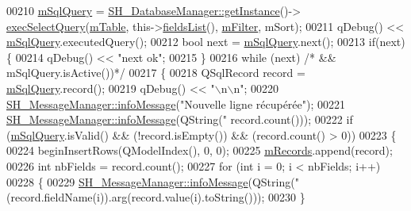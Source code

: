 \begin{DoxyCode}
00210             \hyperlink{classSH__SqlDataModel_a54f0cf057e3200f6b199508958e43fec}{mSqlQuery} = \hyperlink{classSH__DatabaseManager_a31198eb4de0f8b18e3fa0eed09f24d19}{SH\_DatabaseManager::getInstance}()->
      \hyperlink{classSH__DatabaseManager_ab8f9850cb68444ab9a4e613b36a3b044}{execSelectQuery}(\hyperlink{classSH__SqlDataModel_a88b8738a0d2803c94295c90c83d65f32}{mTable}, this->\hyperlink{classSH__SqlDataModel_a571bdc1f9592bd13f98fd748563d46c0}{fieldsList}(), 
      \hyperlink{classSH__SqlDataModel_af83c15ae3ad1dc4617dd58f2a852a1e2}{mFilter}, mSort);
00211             qDebug() << \hyperlink{classSH__SqlDataModel_a54f0cf057e3200f6b199508958e43fec}{mSqlQuery}.executedQuery();
00212             \textcolor{keywordtype}{bool} next = \hyperlink{classSH__SqlDataModel_a54f0cf057e3200f6b199508958e43fec}{mSqlQuery}.next();
00213             \textcolor{keywordflow}{if}(next) \{
00214                 qDebug() << \textcolor{stringliteral}{"next ok"};
00215             \}
00216             \textcolor{keywordflow}{while} (next) \textcolor{comment}{/* && mSqlQuery.isActive())*/}
00217             \{
00218                 QSqlRecord record = \hyperlink{classSH__SqlDataModel_a54f0cf057e3200f6b199508958e43fec}{mSqlQuery}.record();
00219                 qDebug() << \textcolor{stringliteral}{"\(\backslash\)n\(\backslash\)n"};
00220                 \hyperlink{classSH__MessageManager_a0b35c2f96e6d69934bf7f7c1e2172ea9}{SH\_MessageManager::infoMessage}(\textcolor{stringliteral}{"Nouvelle ligne récupérée"});
00221                 \hyperlink{classSH__MessageManager_a0b35c2f96e6d69934bf7f7c1e2172ea9}{SH\_MessageManager::infoMessage}(QString(\textcolor{stringliteral}{"%
      record.count()));
00222                 \textcolor{keywordflow}{if} (\hyperlink{classSH__SqlDataModel_a54f0cf057e3200f6b199508958e43fec}{mSqlQuery}.isValid() && (!record.isEmpty()) && (record.count() > 0))
00223                 \{
00224                     beginInsertRows(QModelIndex(), 0, 0);
00225                     \hyperlink{classSH__SqlDataModel_aa58096989daac3cd3fdea5e6dd4f27ee}{mRecords}.append(record);
00226                     \textcolor{keywordtype}{int} nbFields = record.count();
00227                     \textcolor{keywordflow}{for} (\textcolor{keywordtype}{int} i = 0; i < nbFields; i++)
00228                     \{
00229                         \hyperlink{classSH__MessageManager_a0b35c2f96e6d69934bf7f7c1e2172ea9}{SH\_MessageManager::infoMessage}(QString(\textcolor{stringliteral}{"%
      (record.fieldName(i)).arg(record.value(i).toString()));
00230                     \}
}}
\end{DoxyCode}
